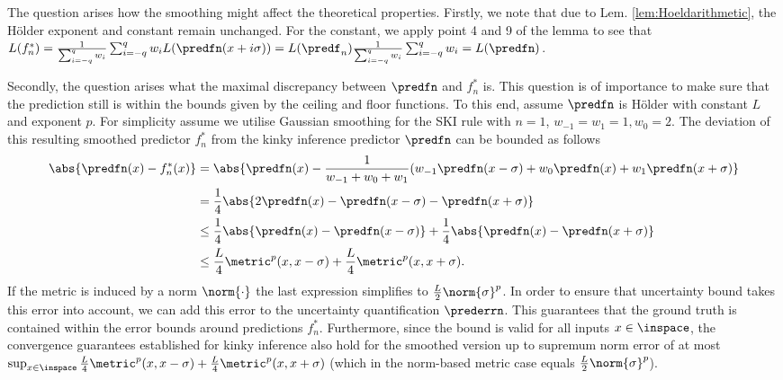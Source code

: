 The question arises how the smoothing might affect the theoretical properties. Firstly, we note that due to Lem. \ref{lem:Hoeldarithmetic}, the H\"older exponent and constant remain unchanged. For the constant, we apply point 4 and 9 of the lemma to see that $L(f_n^*) = \frac{1}{\sum_{i=-q}^q w_i} 
\sum_{i=-q}^q w_i L(\predfn (x+i \sigma)) = L(\predf_n) \frac{1}{\sum_{i=-q}^q w_i}  \sum_{i=-q}^q w_i = L(\predfn)$.

Secondly, the question arises what the maximal discrepancy between $\predfn$ and $f_n^*$ is. This question is of importance to make sure that the prediction still is within the bounds given by the ceiling and floor functions. To this end, assume $\predfn$ is H\"older with constant $L$ and exponent $p$. For simplicity assume we utilise Gaussian smoothing for the SKI rule with $n=1$, $w_{-1} = w_1 =1, w_0 =2$. The deviation of this resulting smoothed predictor $f_n^* $ from the kinky inference predictor $\predfn$ can be bounded as follows
\begin{align}
\abs{\predfn(x) - f_n^*(x)} &= \abs{\predfn(x) - \frac 1 {w_{-1}+w_0+w_1} (w_{-1} \predfn(x-\sigma) + w_0 \predfn(x)+ w_1 \predfn(x+\sigma)} \\
&= \frac 1 4 \abs{ 2 \predfn(x) -   \predfn(x-\sigma) - \predfn(x+\sigma)} \\
&\leq  \frac 1 4 \abs{  \predfn(x) -   \predfn(x-\sigma)} + \frac 1 4 \abs{ \predfn(x) - \predfn(x+\sigma)}\\
&\leq  \frac L 4  \metric^p(x,x-\sigma) + \frac L 4 \metric^p(x,x+\sigma).
\end{align}
If the metric is induced by a norm $\norm{\cdot}$ the last expression simplifies to $\frac L 2 \norm{\sigma}^p$.
In order to ensure that uncertainty bound takes this error into account, we can add this error to the uncertainty quantification $\prederrn$. This guarantees that the ground truth is contained within the error bounds around predictions $f_n^*$. Furthermore, since the bound is valid for all inputs $x \in \inspace$, the convergence guarantees established for kinky inference also hold for the smoothed version up to supremum norm error of at most $\sup_{x \in \inspace} \frac L 4  \metric^p(x,x-\sigma) + \frac L 4 \metric^p(x,x+\sigma)$ (which in the norm-based metric case equals $\frac L 2 \norm{\sigma}^p$).

